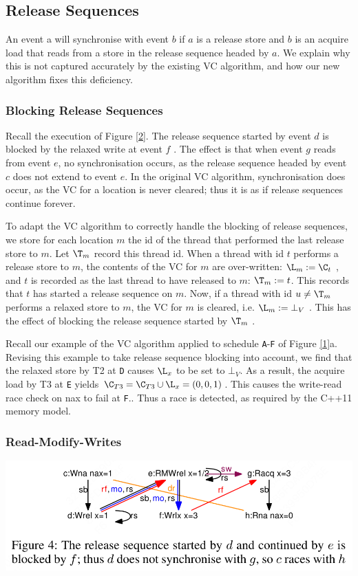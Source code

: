 \documentclass[11pt]{article}
\begin{document}
\subsection{Release Sequences}
\label{sec:org88144de}
An event a will synchronise with event \(b\) if \(a\) is a release store and \(b\) is an acquire load
that reads from a store in the release sequence headed by \(a\). We explain why this is not captured
accurately by the existing VC algorithm, and how our new algorithm fixes this deficiency.
\subsubsection{Blocking Release Sequences}
\label{sec:org140e884}
Recall the execution of Figure \ref{2}. The release sequence started by event \(d\) is blocked by the
relaxed write at event \(f\) . The effect is that when event \(g\) reads from event \(e\), no
synchronisation occurs, as the release sequence headed by event \(c\) does not extend to event \(e\).
In the original VC algorithm, synchronisation does occur, as the VC for a location is never cleared;
thus it is as if release sequences continue forever.

To adapt the VC algorithm to correctly handle the blocking of release sequences, we store for each
location \(m\) the id of the thread that performed the last release store to \(m\). Let \(\T_m\)
record this thread id. When a thread with id \(t\) performs a release store to \(m\), the contents of
the VC for \(m\) are over-written: \(\L_m:=\C_t\) , and \(t\) is recorded as the last thread to have
released to \(m\): \(\T_m:=t\). This records that \(t\) has started a release sequence on \(m\). Now,
if a thread with id \(u\neq\T_m\) performs a relaxed store to \(m\), the VC for \(m\) is cleared, i.e.
\(\L_m:=\bot_V\) . This has the effect of blocking the release sequence started by \(\T_m\) .

\begin{examplle}[]
Recall our example of the VC algorithm applied to schedule \texttt{A}-\texttt{F} of Figure \ref{1}a.
Revising this example to take release sequence blocking into account, we find that the relaxed store
by T2 at \texttt{D} causes \(\L_x\) to be set to \(\bot_V\). As a result, the acquire load by T3 at \texttt{E} yields
\(\C_{T3}=\C_{T3}\cup\L_x=(0,0,1)\). This causes the write-read race check on nax to fail at \texttt{F}.. Thus
a race is detected, as required by the C++11 memory model.
\end{examplle}
\subsubsection{Read-Modify-Writes}
\label{sec:org6df68ed}
\begin{center}
\includegraphics[width=.8\textwidth]{../../images/papers/129.png}
\label{4}
\end{center}
\end{document}
